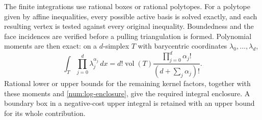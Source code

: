 The finite integrations use rational boxes or rational polytopes.
For a polytope given by affine inequalities, every possible active
basis is solved exactly, and each resulting vertex is tested against
every original inequality.  Boundedness and the face incidences are
verified before a pulling triangulation is formed.  Polynomial
moments are then exact: on a $d$-simplex $T$ with barycentric
coordinates $\lambda_0,\ldots,\lambda_d$,
\begin{equation}
 \int_T\prod_{j=0}^d\lambda_j^{\alpha_j}\,dx
 =d!\operatorname{vol}(T)
   \frac{\prod_{j=0}^d\alpha_j!}{(d+\sum_j\alpha_j)!}.
 \label{num:simplex-moment}
\end{equation}
Rational lower or upper bounds for the remaining kernel factors,
together with these moments and \eqref{num:log-enclosure}, give the
required integral enclosure.  A boundary box in a negative-cost upper
integral is retained with an upper bound for its whole contribution.
